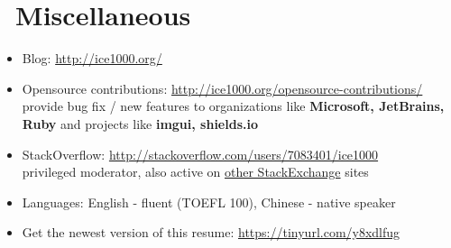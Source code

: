 \documentclass{resume}
\begin{document}
\section{\faInfo\ Miscellaneous}
\begin{itemize}[parsep=0.5ex]
  \item Blog: \url{http://ice1000.org/}
  \item Opensource contributions: \url{http://ice1000.org/opensource-contributions/} \\
    provide bug fix / new features to organizations like \textbf{Microsoft, JetBrains, Ruby}
    and projects like \textbf{imgui, shields.io}
  \item StackOverflow: \url{http://stackoverflow.com/users/7083401/ice1000} \\
    privileged moderator, also active on \href{https://stackexchange.com/users/9532102/ice1000} {other StackExchange} sites
  \item Languages: English - fluent (TOEFL 100), Chinese - native speaker
  \item Get the newest version of this resume: \url{https://tinyurl.com/y8xdlfug}
\end{itemize}

%
%
\end{document}
